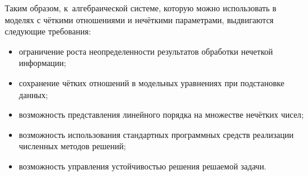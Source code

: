 Таким образом, к~алгебраической системе, которую можно использовать в моделях с чёткими отношениями и нечёткими параметрами, выдвигаются следующие требования:
\begin{itemize}
	\item ограничение роста неопределенности результатов обработки нечеткой информации;
	\item сохранение чётких отношений в модельных уравнениях при подстановке данных;
	\item возможность представления линейного порядка на множестве нечётких чисел;
	\item возможность использования стандартных программных средств реализации численных методов решений;
	\item возможность управления устойчивостью решения решаемой задачи.
\end{itemize}
